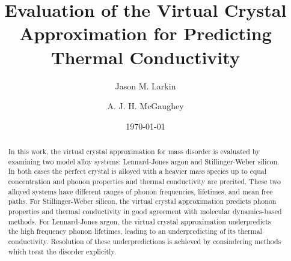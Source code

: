 \documentclass[aps,prb,twocolumn,superscriptaddress,amsmath,amssymb,floatfix]{revtex4}
\begin{document}

\title{Evaluation of the Virtual Crystal Approximation for Predicting 
Thermal Conductivity}
\author{Jason M. Larkin}
\author{A. J. H. McGaughey}

\date{\today}


\begin{abstract}
In this work, the virtual crystal approximation for mass disorder is 
evaluated by examining two model alloy systems: Lennard-Jones argon 
and Stillinger-Weber silicon. In both cases the perfect crystal is 
alloyed with a heavier mass species up to equal concentration and 
phonon properties and thermal conductivity 
are precited. These 
two alloyed systems have different ranges of phonon frequencies, 
lifetimes, and mean free paths.
For Stillinger-Weber silicon, the 
virtual crystal approximation predicts phonon properties and thermal 
conductivity in good agreement with molecular dynamics-based methods. 
For Lennard-Jones argon, the virtual crystal approximation underpredicts 
the high frequency phonon lifetimes, leading to an underpredicting of 
its thermal conductivity. Resolution of these underpredictions is achieved 
by consindering methods which treat the disorder explicitly. 
\end{abstract}


\maketitle
\clearpage
\end{document}
